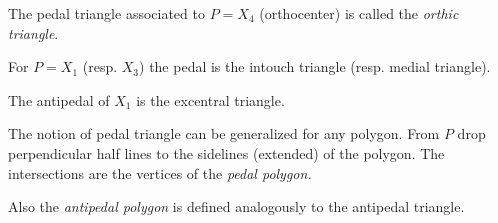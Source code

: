 The pedal triangle associated to  $P=X_4$ (orthocenter) is called the {\em orthic triangle}.
 
 For $P=X_1$ (resp. $X_3$) the pedal is the intouch triangle (resp. medial triangle). 
 
 The antipedal of $X_1$ is the excentral triangle.

The notion of pedal triangle  can be generalized for any polygon. From $P$ drop perpendicular half lines to the sidelines (extended) of the polygon. The intersections are the vertices of the {\em pedal polygon.}

Also the {\em  antipedal polygon} is defined analogously to the antipedal triangle.
 